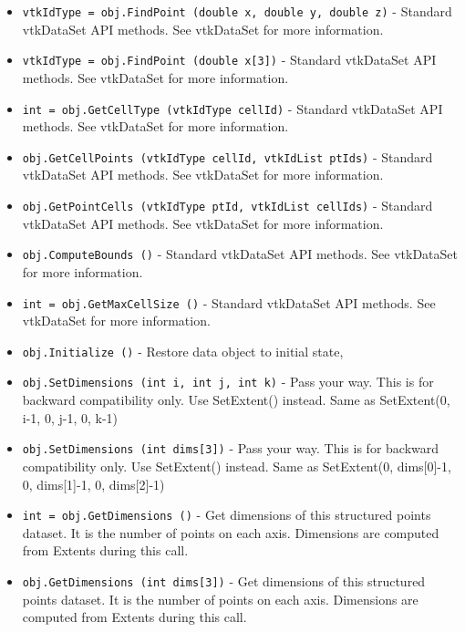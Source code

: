 \begin{itemize}
\item  \verb|vtkIdType = obj.FindPoint (double x, double y, double z)| -  Standard vtkDataSet API methods. See vtkDataSet for more information.

\item  \verb|vtkIdType = obj.FindPoint (double x[3])| -  Standard vtkDataSet API methods. See vtkDataSet for more information.

\item  \verb|int = obj.GetCellType (vtkIdType cellId)| -  Standard vtkDataSet API methods. See vtkDataSet for more information.

\item  \verb|obj.GetCellPoints (vtkIdType cellId, vtkIdList ptIds)| -  Standard vtkDataSet API methods. See vtkDataSet for more information.

\item  \verb|obj.GetPointCells (vtkIdType ptId, vtkIdList cellIds)| -  Standard vtkDataSet API methods. See vtkDataSet for more information.

\item  \verb|obj.ComputeBounds ()| -  Standard vtkDataSet API methods. See vtkDataSet for more information.

\item  \verb|int = obj.GetMaxCellSize ()| -  Standard vtkDataSet API methods. See vtkDataSet for more information.

\item  \verb|obj.Initialize ()| -  Restore data object to initial state,

\item  \verb|obj.SetDimensions (int i, int j, int k)| -  Pass your way. This is for backward compatibility only.
 Use SetExtent() instead.
 Same as SetExtent(0, i-1, 0, j-1, 0, k-1)

\item  \verb|obj.SetDimensions (int dims[3])| -  Pass your way. This is for backward compatibility only.
 Use SetExtent() instead.
 Same as SetExtent(0, dims[0]-1, 0, dims[1]-1, 0, dims[2]-1)

\item  \verb|int = obj.GetDimensions ()| -  Get dimensions of this structured points dataset.
 It is the number of points on each axis.
 Dimensions are computed from Extents during this call.

\item  \verb|obj.GetDimensions (int dims[3])| -  Get dimensions of this structured points dataset.
 It is the number of points on each axis.
 Dimensions are computed from Extents during this call.


\end{itemize}

